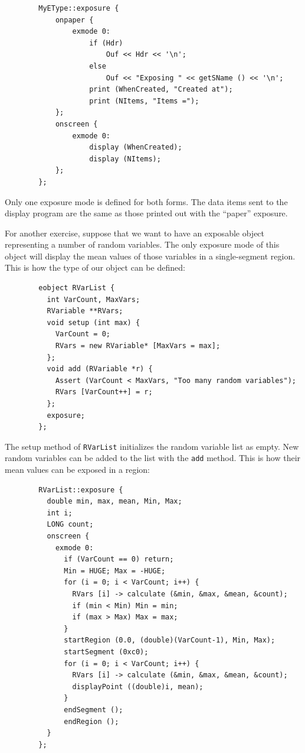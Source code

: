 \begin{verbatim}
        MyEType::exposure {
            onpaper {
                exmode 0:
                    if (Hdr)
                        Ouf << Hdr << '\n';
                    else
                        Ouf << "Exposing " << getSName () << '\n';
                    print (WhenCreated, "Created at");
                    print (NItems, "Items =");
            };
            onscreen {
                exmode 0:
                    display (WhenCreated);
                    display (NItems);
            };
        };
\end{verbatim}

Only one exposure mode is defined for both forms.
The data items sent to the display program are the same as those
printed out with the ``paper'' exposure.

For another exercise, suppose that we want to have an exposable
object representing a number of random variables.
The only exposure mode of this object will display the mean values of
those variables in a single-segment region.
This is how the type of our object can be defined:

\begin{verbatim}
        eobject RVarList {
          int VarCount, MaxVars;
          RVariable **RVars;
          void setup (int max) {
            VarCount = 0;
            RVars = new RVariable* [MaxVars = max];
          };
          void add (RVariable *r) {
            Assert (VarCount < MaxVars, "Too many random variables");
            RVars [VarCount++] = r;
          };
          exposure;
        };
\end{verbatim}

The setup method of {\tt RVarList} initializes the random variable list as
empty.
New random variables can be added to the list with the {\tt add}
method.
This is how their mean values can be exposed in a region:

\begin{verbatim}
        RVarList::exposure {
          double min, max, mean, Min, Max;
          int i;
          LONG count;
          onscreen {
            exmode 0:
              if (VarCount == 0) return;
              Min = HUGE; Max = -HUGE;
              for (i = 0; i < VarCount; i++) {
                RVars [i] -> calculate (&min, &max, &mean, &count);
                if (min < Min) Min = min;
                if (max > Max) Max = max;
              }
              startRegion (0.0, (double)(VarCount-1), Min, Max);
              startSegment (0xc0);
              for (i = 0; i < VarCount; i++) {
                RVars [i] -> calculate (&min, &max, &mean, &count);
                displayPoint ((double)i, mean);
              }
              endSegment ();
              endRegion ();
          }
        };
\end{verbatim}

